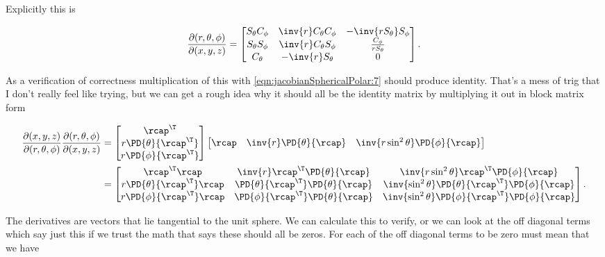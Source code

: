 Explicitly this is

\begin{align}\label{eqn:jacobianSphericalPolar:18}
\frac{\partial (r,\theta,\phi)}{\partial (x, y, z)}
=
\begin{bmatrix}
S_\theta C_\phi & \inv{r} C_\theta C_\phi & -\inv{r S_\theta} S_\phi \\
S_\theta S_\phi & \inv{r} C_\theta S_\phi & \frac{C_\phi}{r S_\theta} \\
C_\theta        & -\inv{r} S_\theta       &  0
\end{bmatrix}.
\end{align} 

As a verification of correctness multiplication of this with \ref{eqn:jacobianSphericalPolar:7} should produce identity.  That's a mess of trig that I don't really feel like trying, but we can get a rough idea why it should all be the identity matrix by multiplying it out in block matrix form

\begin{align*}
\frac{\partial (x,y,z)}{\partial (r,\theta,\phi)}
\frac{\partial (r,\theta,\phi)}{\partial (x, y, z)}
&=
\begin{bmatrix} 
\rcap^\T \\
r \PD{\theta}{\rcap^\T} \\
r \PD{\phi}{\rcap^\T} 
\end{bmatrix}
\begin{bmatrix}
\rcap & \inv{r} \PD{\theta}{\rcap} & \inv{r \sin^2\theta} \PD{\phi}{\rcap}
\end{bmatrix} \\
&=
\begin{bmatrix} 
\rcap^\T \rcap                & \inv{r} \rcap^\T \PD{\theta}{\rcap}      & \inv{r \sin^2 \theta} \rcap^\T \PD{\phi}{\rcap} \\
r \PD{\theta}{\rcap^\T} \rcap & \PD{\theta}{\rcap^\T} \PD{\theta}{\rcap} & \inv{\sin^2\theta} \PD{\theta}{\rcap^\T} \PD{\phi}{\rcap} \\
r \PD{\phi}{\rcap^\T} \rcap   & \PD{\phi}{\rcap^\T} \PD{\theta}{\rcap}   & \inv{\sin^2\theta} \PD{\phi}{\rcap^\T} \PD{\phi}{\rcap}
\end{bmatrix}.
\end{align*}

The derivatives are vectors that lie tangential to the unit sphere.  We can calculate this to verify, or we can look at the off diagonal terms which say just this if we trust the math that says these should all be zeros.  For each of the off diagonal terms to be zero must mean that we have

